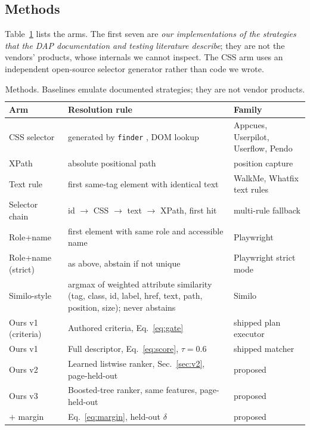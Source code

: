 \documentclass[conference]{IEEEtran}
\begin{document}
\subsection{Methods}
Table~\ref{tab:methods} lists the arms. The first seven are \emph{our implementations of the strategies that the DAP documentation and testing literature describe}; they are not the vendors' products, whose internals we cannot inspect. The CSS arm uses an independent open-source selector generator \cite{medv_finder} rather than code we wrote.

\begin{table}[!t]
\caption{Methods. Baselines emulate documented strategies; they are not vendor products.}
\label{tab:methods}
\centering\scriptsize
\begin{tabular}{@{}p{2.0cm}p{3.7cm}p{1.6cm}@{}}
\toprule
Arm & Resolution rule & Family\\
\midrule
CSS selector & generated by \texttt{finder} \cite{medv_finder}, DOM lookup & Appcues, Userpilot, Userflow, Pendo\\
XPath & absolute positional path & position capture\\
Text rule & first same-tag element with identical text & WalkMe, Whatfix text rules\\
Selector chain & id $\to$ CSS $\to$ text $\to$ XPath, first hit & multi-rule fallback\\
Role+name & first element with same role and accessible name & Playwright \cite{playwright_locators}\\
Role+name (strict) & as above, abstain if not unique & Playwright strict mode\\
Similo-style & argmax of weighted attribute similarity (tag, class, id, label, href, text, path, position, size); never abstains & Similo \cite{nass2023similo}\\
\midrule
Ours v1 (criteria) & Authored criteria, Eq.~\eqref{eq:gate} & shipped plan executor\\
Ours v1 & Full descriptor, Eq.~\eqref{eq:score}, $\tau{=}0.6$ & shipped matcher\\
Ours v2 & Learned listwise ranker, Sec.~\ref{sec:v2}, page-held-out & proposed\\
Ours v3 & Boosted-tree ranker, same features, page-held-out & proposed\\
$+$ margin & Eq.~\eqref{eq:margin}, held-out $\delta$ & proposed\\
\bottomrule
\end{tabular}
\end{table}
\end{document}
